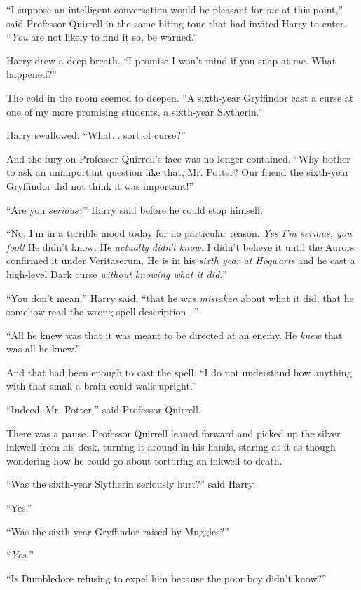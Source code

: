 ``I suppose an intelligent conversation would be pleasant for \emph{me} at this point,'' said Professor Quirrell in the same biting tone that had invited Harry to enter. ``\emph{You} are not likely to find it so, be warned.''

Harry drew a deep breath. ``I promise I won't mind if you snap at me. What happened?''

The cold in the room seemed to deepen. ``A sixth-year Gryffindor cast a curse at one of my more promising students, a sixth-year Slytherin.''

Harry swallowed. ``What... sort of curse?''

And the fury on Professor Quirrell's face was no longer contained. ``Why bother to ask an unimportant question like that, Mr. Potter? Our friend the sixth-year Gryffindor did not think it was important!''

``Are you \emph{serious?}'' Harry said before he could stop himself.

``No, I'm in a terrible mood today for no particular reason. \emph{Yes I'm serious, you fool!} He didn't know. He \emph{actually didn't know.} I didn't believe it until the Aurors confirmed it under Veritaserum. He is in his \emph{sixth year at Hogwarts} and he cast a high-level Dark curse \emph{without knowing what it did.}''

``You don't mean,'' Harry said, ``that he was \emph{mistaken} about what it did, that he somehow read the wrong spell description~-''

``All he knew was that it was meant to be directed at an enemy. He \emph{knew} that was all he knew.''

And that had been enough to cast the spell. ``I do not understand how anything with that small a brain could walk upright.''

``Indeed, Mr. Potter,'' said Professor Quirrell.

There was a pause. Professor Quirrell leaned forward and picked up the silver inkwell from his desk, turning it around in his hands, staring at it as though wondering how he could go about torturing an inkwell to death.

``Was the sixth-year Slytherin seriously hurt?'' said Harry.

``Yes.''

``Was the sixth-year Gryffindor raised by Muggles?''

``\emph{Yes.}''

``Is Dumbledore refusing to expel him because the poor boy didn't know?''

